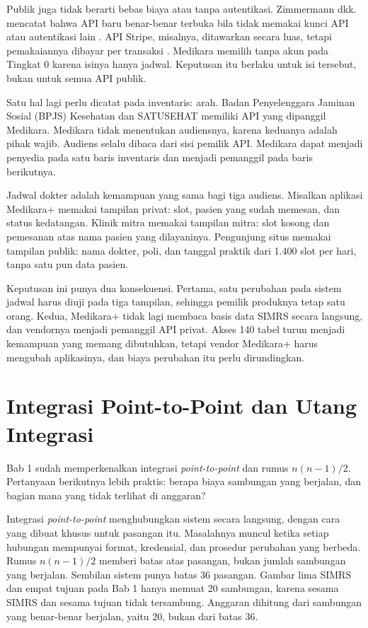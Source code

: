 Publik juga tidak berarti bebas biaya atau tanpa autentikasi. Zimmermann dkk. mencatat bahwa API baru
benar-benar terbuka bila tidak memakai kunci API atau autentikasi lain
\cite{zimmermann2022patterns}. API Stripe, misalnya, ditawarkan secara luas, tetapi pemakaiannya dibayar
per transaksi \cite{stripe-pricing}. Medikara memilih tanpa akun pada Tingkat 0
karena isinya hanya jadwal. Keputusan itu berlaku untuk isi tersebut, bukan untuk semua API publik.

Satu hal lagi perlu dicatat pada inventaris: arah. Badan Penyelenggara Jaminan Sosial (BPJS) Kesehatan dan
SATUSEHAT memiliki API yang dipanggil Medikara. Medikara tidak menentukan audiensnya, karena keduanya
adalah pihak wajib. Audiens selalu dibaca dari sisi pemilik API. Medikara dapat
menjadi penyedia pada satu baris inventaris dan menjadi pemanggil pada baris berikutnya.

\begin{kasus}[title={Kasus Medikara Health: Satu Kemampuan Jadwal, Tiga Tampilan}]
Jadwal dokter adalah kemampuan yang sama bagi tiga audiens. Misalkan aplikasi Medikara+ memakai tampilan
privat: slot, pasien yang sudah memesan, dan status kedatangan. Klinik mitra memakai tampilan mitra: slot
kosong dan pemesanan atas nama pasien yang dilayaninya. Pengunjung situs memakai tampilan publik: nama
dokter, poli, dan tanggal praktik dari 1.400 slot per hari, tanpa satu pun data pasien.

Keputusan ini punya dua konsekuensi. Pertama, satu perubahan pada sistem jadwal harus diuji pada tiga
tampilan, sehingga pemilik produknya tetap satu orang. Kedua, Medikara+ tidak lagi membaca basis data
SIMRS secara langsung, dan vendornya menjadi pemanggil API privat. Akses 140 tabel turun menjadi
kemampuan yang memang dibutuhkan, tetapi vendor Medikara+ harus mengubah aplikasinya, dan biaya perubahan
itu perlu dirundingkan.
\end{kasus}

\section{Integrasi Point-to-Point dan Utang Integrasi}

Bab 1 sudah memperkenalkan integrasi \textit{point-to-point} dan rumus $n(n-1)/2$. Pertanyaan berikutnya
lebih praktis: berapa biaya sambungan yang berjalan, dan bagian mana yang tidak terlihat di anggaran?

Integrasi \textit{point-to-point} menghubungkan sistem secara langsung, dengan cara yang dibuat khusus
untuk pasangan itu. Masalahnya muncul ketika setiap hubungan mempunyai format, kredensial, dan prosedur
perubahan yang berbeda. Rumus $n(n-1)/2$ memberi batas atas pasangan, bukan jumlah sambungan yang
berjalan. Sembilan sistem punya batas 36 pasangan. Gambar lima SIMRS dan empat tujuan pada Bab 1 hanya
memuat 20 sambungan, karena sesama SIMRS dan sesama tujuan tidak tersambung. Anggaran dihitung dari sambungan yang
benar-benar berjalan, yaitu 20, bukan dari batas 36.

